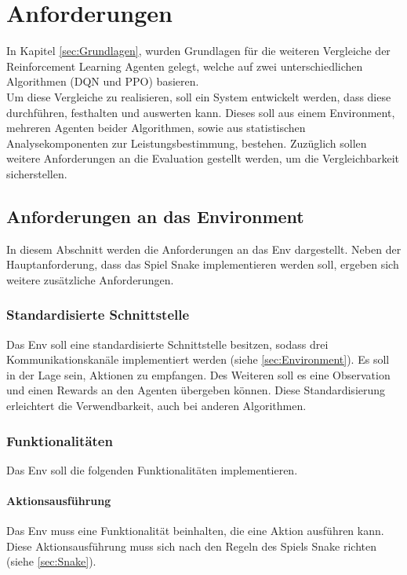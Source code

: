 \chapter{Anforderungen} \label{chap:Anforderungen}
In Kapitel \ref{sec:Grundlagen}, wurden Grundlagen für die weiteren Vergleiche der Reinforcement Learning Agenten gelegt, welche auf zwei unterschiedlichen Algorithmen (DQN und PPO) basieren.\\
Um diese Vergleiche zu realisieren, soll ein System entwickelt werden, dass diese durchführen, festhalten und auswerten kann. Dieses soll aus einem Environment, mehreren Agenten beider Algorithmen, sowie aus statistischen Analysekomponenten zur Leistungsbestimmung, bestehen. Zuzüglich sollen weitere Anforderungen an die Evaluation gestellt werden, um die Vergleichbarkeit sicherstellen.

\section{Anforderungen an das Environment} \label{sec:Anforderungen_Env}
In diesem Abschnitt werden die Anforderungen an das Env dargestellt. Neben der Hauptanforderung, dass das Spiel Snake implementieren werden soll, ergeben sich weitere zusätzliche Anforderungen.

\subsection{Standardisierte Schnittstelle} \label{sec:Anforderungen_Schnittstelle}
Das Env soll eine standardisierte Schnittstelle besitzen, sodass drei Kommunikationskanäle implementiert werden (siehe \ref{sec:Environment}). Es soll in der Lage sein, Aktionen zu empfangen. Des Weiteren soll es eine Observation und einen Rewards an den Agenten übergeben können. Diese Standardisierung erleichtert die Verwendbarkeit, auch bei anderen Algorithmen.

\subsection{Funktionalitäten} \label{sec:Anforderungen_funktionalität_Env}
Das Env soll die folgenden Funktionalitäten implementieren.

\subsubsection{Aktionsausführung} \label{sec:Anforderungen_Aktionsausführung}
Das Env muss eine Funktionalität beinhalten, die eine Aktion ausführen kann. Diese Aktionsausführung muss sich nach den Regeln des Spiels Snake richten (siehe \ref{sec:Snake}).

